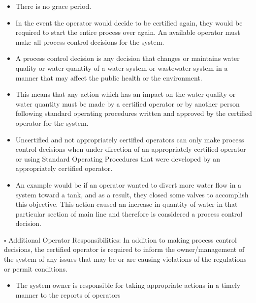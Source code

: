 \documentclass[10pt]{article}
\begin{document}
\begin{itemize}
  \item There is no grace period.

  \item In the event the operator would decide to be certified again, they would be required to start the entire process over again. An available operator must make all process control decisions for the system.

  \item A process control decision is any decision that changes or maintains water quality or water quantity of a water system or wastewater system in a manner that may affect the public health or the environment.

  \item This means that any action which has an impact on the water quality or water quantity must be made by a certified operator or by another person following standard operating procedures written and approved by the certified operator for the system.

  \item Uncertified and not appropriately certified operators can only make process control decisions when under direction of an appropriately certified operator or using Standard Operating Procedures that were developed by an appropriately certified operator.

  \item An example would be if an operator wanted to divert more water flow in a system toward a tank, and as a result, they closed some valves to accomplish this objective. This action caused an increase in quantity of water in that particular section of main line and therefore is considered a process control decision.

\end{itemize}
$\square$ Additional Operator Responsibilities: In addition to making process control decisions, the certified operator is required to inform the owner/management of the system of any issues that may be or are causing violations of the regulations or permit conditions.

\begin{itemize}
  \item The system owner is responsible for taking appropriate actions in a timely manner to the reports of operators
\end{itemize}
\end{document}
